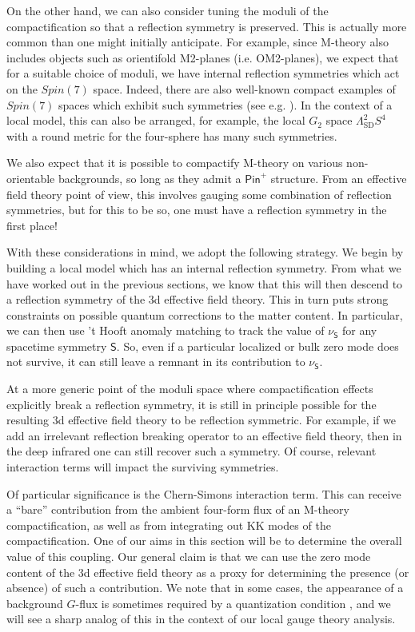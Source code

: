 \documentclass[12pt]{article}%
\numberwithin{equation}{section}
\renewcommand{\(}{\left(}
\renewcommand{\)}{\right)}
\renewcommand{\[}{\left[}
\renewcommand{\]}{\right]}
\begin{document}
On the other hand, we can also consider tuning the moduli of the compactification so that a reflection symmetry is preserved. This is
actually more common than one might initially anticipate. For example, since M-theory also
includes objects such as orientifold M2-planes (i.e. OM2-planes), we expect that for a suitable choice of moduli, we have internal
reflection symmetries which act on the $Spin(7)$ space. Indeed, there are also well-known compact examples of $Spin(7)$ spaces which exhibit such symmetries (see e.g. \cite{Joyce:1999nk, JoyceBook}). In the context of a local model, this can also be arranged, for example, the local $G_2$ space $\Lambda^{2}_{\mathrm{SD}} S^4$ with a round metric for the four-sphere has many such symmetries.

We also expect that it is possible to compactify M-theory on various non-orientable backgrounds,
so long as they admit a $\mathsf{Pin}^{+}$ structure. From an effective field theory point of view, this involves
gauging some combination of reflection symmetries, but for this to be so, one must have a reflection symmetry in the first place!

With these considerations in mind, we adopt the following strategy. We begin by building a local model which has an internal reflection symmetry. From what we have worked out in the previous sections, we know that this will then descend to a reflection symmetry of the 3d effective field theory. This in turn puts strong constraints on possible quantum corrections to the matter content. In particular, we can then use 't Hooft
anomaly matching to track the value of $\nu_{\mathsf{S}}$ for any spacetime symmetry $\mathsf{S}$. So, even if a particular localized or bulk zero mode does not survive, it can still leave a remnant in its contribution to $\nu_{\mathsf{S}}$.

At a more generic point of the moduli space where compactification effects explicitly break a reflection symmetry, it is still in principle possible for the resulting 3d effective field theory to be reflection symmetric. For example, if we add an irrelevant reflection breaking operator to an effective field theory, then in the deep infrared one can still recover such a symmetry. Of course, relevant interaction terms will
impact the surviving symmetries.

Of particular significance is the Chern-Simons interaction term. This can receive a ``bare'' contribution from the ambient four-form
flux of an M-theory compactification, as well as from integrating out KK modes of the compactification. One of our aims in this section will be
to determine the overall value of this coupling. Our general claim is that we can use the zero mode content of the 3d effective field theory as a proxy for determining the presence (or absence) of such a contribution. We note that in some cases, the appearance of a background $G$-flux is sometimes required by a quantization condition \cite{Gukov:2001hf, Gukov:2002zg}, and we will see a sharp analog of this in the context of our local gauge theory analysis.
\end{document}
